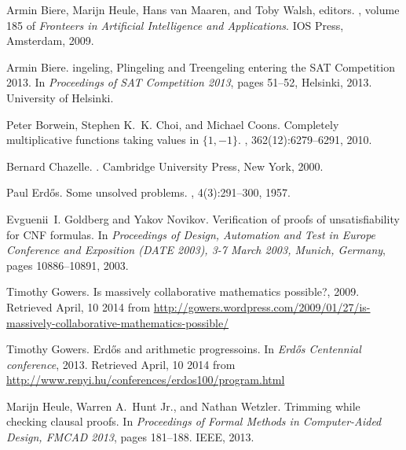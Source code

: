 \documentclass{article} \usepackage[utf8]{inputenc}
\begin{document}
\begin{thebibliography}{}
Armin Biere, Marijn Heule, Hans van Maaren, and Toby Walsh, editors.
, volume 185 of {\em Fronteers in
  Artificial Intelligence and Applications}.
\newblock IOS Press, Amsterdam, 2009.

Armin Biere.
ingeling, {P}lingeling and {T}reengeling entering the {SAT}
  {C}ompetition 2013.
\newblock In {\em Proceedings of SAT Competition 2013}, pages 51--52, Helsinki,
  2013. University of Helsinki.

Peter Borwein, Stephen K.~K. Choi, and Michael Coons.
\newblock Completely multiplicative functions taking values in {$\{ 1,-1 \}$}.
,
  362(12):6279--6291, 2010.

Bernard Chazelle.
.
\newblock Cambridge University Press, New York, 2000.

Paul {Erd\H{o}s}.
\newblock Some unsolved problems.
, 4(3):291--300, 1957.

Evguenii~I. Goldberg and Yakov Novikov.
\newblock Verification of proofs of unsatisfiability for {CNF} formulas.
\newblock In {\em Proceedings of Design, Automation and Test in Europe
  Conference and Exposition (DATE 2003), 3-7 March 2003, Munich, Germany},
  pages 10886--10891, 2003.

Timothy Gowers.
\newblock Is massively collaborative mathematics possible?, 2009.
\newblock 
Retrieved April, 10 2014 from
  \url{http://gowers.wordpress.com/2009/01/27/is-massively-collaborative-mathematics-possible/}

Timothy Gowers.
\newblock Erd{\H{o}}s and arithmetic progressoins.
\newblock In {\em Erd{\H{o}}s Centennial conference}, 2013.
\newblock
Retrieved April, 10 2014 from
  \url{http://www.renyi.hu/conferences/erdos100/program.html}

Marijn Heule, Warren A.~Hunt Jr., and Nathan Wetzler.
\newblock Trimming while checking clausal proofs.
\newblock In {\em Proceedings of Formal Methods in Computer-Aided Design, FMCAD
  2013}, pages 181--188. IEEE, 2013.


\end{thebibliography}
\end{document}

